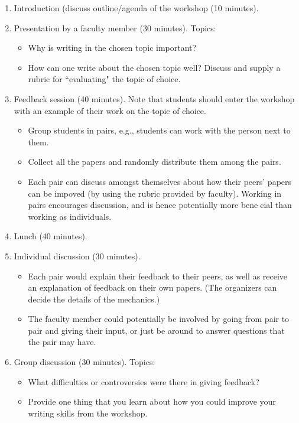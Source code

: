 \documentclass[11pt,a4paper]{article}
\begin{document}
\begin{enumerate}
\item Introduction (discuss outline/agenda of the workshop (10 minutes). 
\item Presentation by a faculty member (30 minutes). Topics:
\begin{itemize}
\item Why is writing in the chosen topic important?
\item How can one write about the chosen topic well? Discuss and supply a rubric for ``evaluating" the topic of choice.
\end{itemize}
\item Feedback session (40 minutes). Note that students should enter the workshop with an example of their work on the topic of choice.
\begin{itemize}
\item Group students in pairs, e.g., students can work with the person next to them. 
\item Collect all the papers and randomly distribute them among the pairs. 
\item Each pair can discuss amongst themselves about how their peers' papers can be impoved (by using the rubric provided by faculty). Working in pairs encourages discussion, and is hence potentially more benecial than working as individuals.
\end{itemize}
\item Lunch (40 minutes). 
\item Individual discussion (30 minutes).
\begin{itemize}
\item Each pair would  explain their feedback to their peers, as well as receive an explanation of feedback on their own papers. (The organizers can decide the details of the mechanics.)
\item The faculty member could potentially be involved by
going from pair to pair and giving their input, or just be around to answer questions
that the pair may have.
\end{itemize}
\item Group discussion (30 minutes). Topics:
\begin{itemize}
\item What difficulties or controversies were there in giving feedback?
\item Provide one thing that you learn about how you could improve your writing
skills from the workshop. 
\end{itemize}
\end{enumerate}
\end{document}
